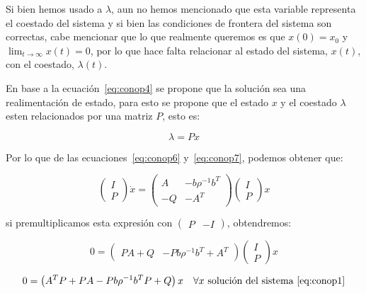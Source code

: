     Si bien hemos usado a $\lambda$, aun no hemos mencionado que esta variable representa el coestado del sistema y si bien las condiciones de frontera del sistema son correctas, cabe mencionar que lo que realmente queremos es que $x(0) = x_0$ y $\lim_{t \to \infty} x(t) = 0$, por lo que hace falta relacionar al estado del sistema, $x(t)$, con el coestado, $\lambda(t)$.

    En base a la ecuación~\ref{eq:conop4} se propone que la solución sea una realimentación de estado, para esto se propone que el estado $x$ y el coestado $\lambda$ esten relacionados por una matriz $P$, esto es:

    \begin{equation} \label{eq:conop7}
        \lambda = P x
    \end{equation}

    Por lo que de las ecuaciones~\ref{eq:conop6} y~\ref{eq:conop7}, podemos obtener que:

    \begin{equation*}
        \begin{pmatrix}
            I \\
            P
        \end{pmatrix} \dot{x}=
        \begin{pmatrix}
            A & -b \rho^{-1} b^T \\
            - Q & - A^T
        \end{pmatrix}
        \begin{pmatrix}
            I \\
            P
        \end{pmatrix} x
    \end{equation*}

    si premultiplicamos esta expresión con $\begin{pmatrix} P & -I \end{pmatrix}$, obtendremos:

    \begin{equation*}
        0 =
        \begin{pmatrix}
            P A + Q & -P b \rho^{-1} b^T + A^T
        \end{pmatrix}
        \begin{pmatrix}
            I \\
            P
        \end{pmatrix} x
    \end{equation*}

    \begin{equation*}
        0 = \left( A^T P + P A - P b \rho^{-1} b^T P + Q \right) x \quad \forall x \text{ solución del sistema~\ref{eq:conop1}}
    \end{equation*}

